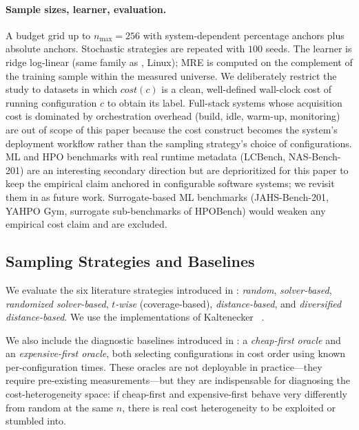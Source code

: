 \paragraph*{Sample sizes, learner, evaluation.}
A budget grid up to $n_{\max}=256$ with system-dependent
percentage anchors plus absolute anchors. Stochastic strategies are
repeated with $100$ seeds. The learner is ridge log-linear (same
family as \StudyReplication, Linux); MRE is computed on the complement
of the training sample within the measured universe.
We deliberately restrict the study to datasets in which
$\mathit{cost}(c)$ is a clean, well-defined wall-clock cost of running
configuration $c$ to obtain its label. Full-stack systems whose
acquisition cost is dominated by orchestration overhead (build, idle,
warm-up, monitoring) are out of scope of this paper because the cost
construct becomes the system's deployment workflow rather than the
sampling strategy's choice of configurations. ML and HPO benchmarks with
real runtime metadata (\eg LCBench, NAS-Bench-201) are an interesting
secondary direction but are deprioritized for this paper to keep the
empirical claim anchored in configurable software systems; we revisit
them in  as future work. Surrogate-based ML
benchmarks (JAHS-Bench-201, YAHPO Gym, surrogate sub-benchmarks of
HPOBench) would weaken any empirical cost claim and are excluded.

\subsection{Sampling Strategies and Baselines}
\label{subsec:strategies}

We evaluate the six literature strategies introduced in
: \emph{random},
\emph{solver-based}, \emph{randomized solver-based}, \emph{$t$-wise}
(coverage-based), \emph{distance-based}, and \emph{diversified
distance-based}. We use the implementations of Kaltenecker
\etal~\cite{kaltenecker2019}.

We also include the diagnostic baselines introduced in
: a \emph{cheap-first oracle} and an
\emph{expensive-first oracle}, both selecting configurations in cost order
using known per-configuration times. These oracles are not deployable in
practice---they require pre-existing measurements---but they are
indispensable for diagnosing the cost-heterogeneity space: if cheap-first and
expensive-first behave very differently from random at the same $n$, there is
real cost heterogeneity to be exploited or stumbled into.

